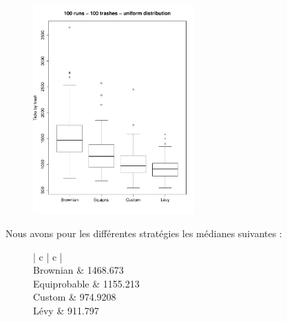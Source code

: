 
\begin{figure}[H]
	\begin{center}
		\includegraphics[height=8cm]{diagrams/100TrRnd_all.pdf}
		\caption{}
		\label{fig:100Trashes_Rnd}
	\end{center}
\end{figure}

Nous avons pour les différentes stratégies les médianes suivantes :

\begin{figure}[H]
	\begin{center}
		\begin{tabular}{ | c | c | }
			\hline
			 \\
			\hline
			Brownian & 1468.673 \\
			Equiprobable & 1155.213 \\
			Custom & 974.9208 \\
			Lévy & 911.797 \\
			\hline
		\end{tabular}
	\end{center}
\end{figure}

